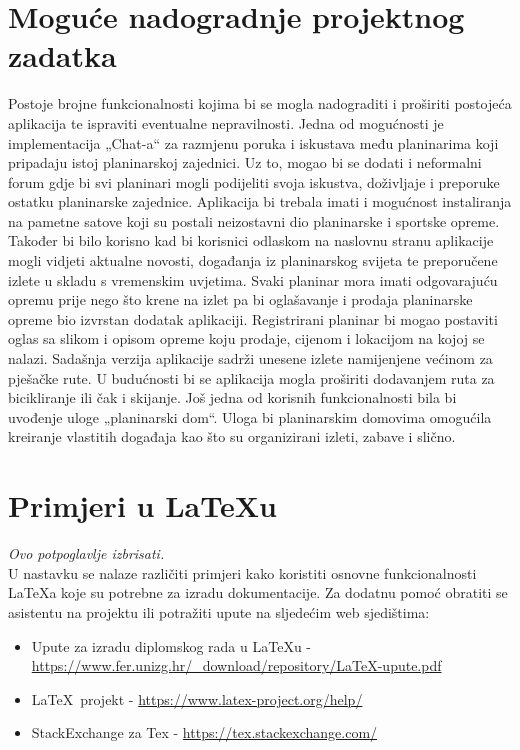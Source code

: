 		\section{Moguće nadogradnje projektnog zadatka}
		Postoje brojne funkcionalnosti kojima bi se mogla nadograditi i proširiti postojeća aplikacija te ispraviti eventualne nepravilnosti. Jedna od mogućnosti je implementacija „Chat-a“ za razmjenu poruka i iskustava među planinarima koji pripadaju istoj planinarskoj zajednici. Uz to, mogao bi se dodati i neformalni forum gdje bi svi planinari mogli podijeliti svoja iskustva, doživljaje i preporuke ostatku planinarske zajednice. Aplikacija bi trebala imati i mogućnost instaliranja na pametne satove koji su postali neizostavni dio planinarske i sportske opreme.  Također bi bilo korisno kad bi korisnici odlaskom na naslovnu stranu aplikacije mogli vidjeti aktualne novosti, događanja iz planinarskog svijeta te preporučene izlete u skladu s vremenskim uvjetima. Svaki planinar mora imati odgovarajuću opremu prije nego što krene na izlet pa bi oglašavanje i prodaja planinarske opreme bio izvrstan dodatak aplikaciji. Registrirani planinar bi mogao postaviti oglas sa slikom i opisom opreme koju prodaje, cijenom i lokacijom na kojoj se nalazi. Sadašnja verzija aplikacije sadrži unesene izlete namijenjene većinom za pješačke rute. U budućnosti bi se aplikacija mogla proširiti dodavanjem ruta za bicikliranje ili čak i skijanje. Još jedna od korisnih funkcionalnosti bila bi uvođenje uloge „planinarski dom“. Uloga bi planinarskim domovima omogućila kreiranje vlastitih događaja kao što su organizirani izleti, zabave i slično. 
		
		\section{Primjeri u \LaTeX u}
		
		\textit{Ovo potpoglavlje izbrisati.}\\

		U nastavku se nalaze različiti primjeri kako koristiti osnovne funkcionalnosti \LaTeX a koje su potrebne za izradu dokumentacije. Za dodatnu pomoć obratiti se asistentu na projektu ili potražiti upute na sljedećim web sjedištima:
		\begin{itemize}
			\item Upute za izradu diplomskog rada u \LaTeX u - \url{https://www.fer.unizg.hr/_download/repository/LaTeX-upute.pdf}
			\item \LaTeX\ projekt - \url{https://www.latex-project.org/help/}
			\item StackExchange za Tex - \url{https://tex.stackexchange.com/}\\
		
		\end{itemize} 	



